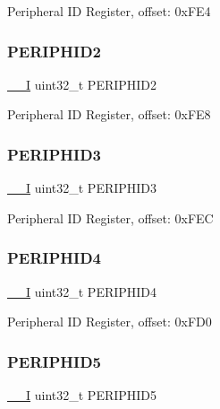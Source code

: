Peripheral ID Register, offset\+: 0x\+F\+E4 \mbox{\label{struct_m_t_b___type_a94da77c610b86d788d32cc8cb6871d23}} 
\subsubsection{\texorpdfstring{PERIPHID2}{PERIPHID2}}
{\footnotesize\ttfamily \mbox{\hyperlink{core__cm0plus_8h_af63697ed9952cc71e1225efe205f6cd3}{\+\_\+\+\_\+I}} uint32\+\_\+t P\+E\+R\+I\+P\+H\+I\+D2}

Peripheral ID Register, offset\+: 0x\+F\+E8 \mbox{\label{struct_m_t_b___type_a9ebff4a243ecc983d7f4de875b7669d6}} 
\subsubsection{\texorpdfstring{PERIPHID3}{PERIPHID3}}
{\footnotesize\ttfamily \mbox{\hyperlink{core__cm0plus_8h_af63697ed9952cc71e1225efe205f6cd3}{\+\_\+\+\_\+I}} uint32\+\_\+t P\+E\+R\+I\+P\+H\+I\+D3}

Peripheral ID Register, offset\+: 0x\+F\+EC \mbox{\label{struct_m_t_b___type_a6d57dd25c691557286930237edb832ab}} 
\subsubsection{\texorpdfstring{PERIPHID4}{PERIPHID4}}
{\footnotesize\ttfamily \mbox{\hyperlink{core__cm0plus_8h_af63697ed9952cc71e1225efe205f6cd3}{\+\_\+\+\_\+I}} uint32\+\_\+t P\+E\+R\+I\+P\+H\+I\+D4}

Peripheral ID Register, offset\+: 0x\+F\+D0 \mbox{\label{struct_m_t_b___type_a97fbe48fa2f04fa8bd5f27b255d5e0ab}} 
\subsubsection{\texorpdfstring{PERIPHID5}{PERIPHID5}}
{\footnotesize\ttfamily \mbox{\hyperlink{core__cm0plus_8h_af63697ed9952cc71e1225efe205f6cd3}{\+\_\+\+\_\+I}} uint32\+\_\+t P\+E\+R\+I\+P\+H\+I\+D5}

